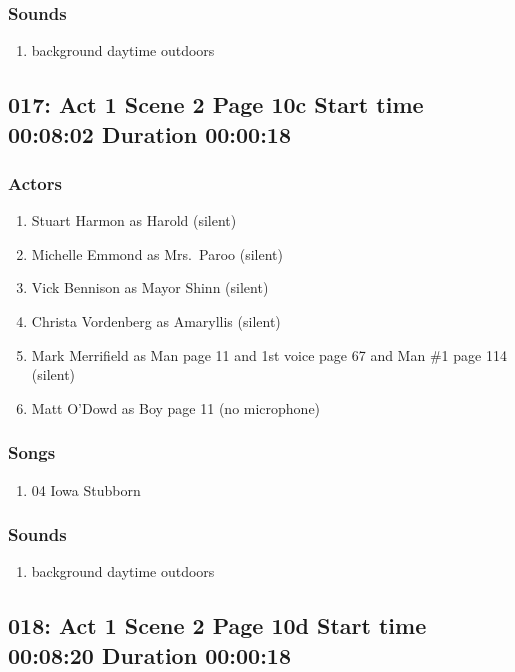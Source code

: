 \subsubsection{Sounds}
\begin{enumerate}
\item background daytime outdoors
\end{enumerate}
\subsection{017: Act 1 Scene 2 Page 10c Start time 00:08:02 Duration 00:00:18}

\subsubsection{Actors}
\begin{enumerate}
\item Stuart Harmon as Harold (silent)
\item Michelle Emmond as Mrs.~Paroo (silent)
\item Vick Bennison as Mayor Shinn (silent)
\item Christa Vordenberg as Amaryllis (silent)
\item Mark Merrifield as Man page 11 and 1st voice page 67 and Man \#1 page 114 (silent)
\item Matt O'Dowd as Boy page 11 (no microphone)
\end{enumerate}

\subsubsection{Songs}
\begin{enumerate}
\item 04 Iowa Stubborn
\end{enumerate}\subsubsection{Sounds}
\begin{enumerate}
\item background daytime outdoors
\end{enumerate}
\subsection{018: Act 1 Scene 2 Page 10d Start time 00:08:20 Duration 00:00:18}

